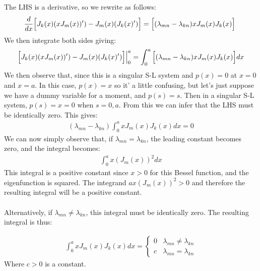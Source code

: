 \documentclass{article}
\begin{document}
The LHS is a derivative, so we rewrite as follows:
\begin{equation}
\begin{aligned}
\frac{d}{dx} \Big{[}J_k(x)(xJ_m(x))') - J_m(x)(J_k(x)') \Big{]} = \Big{[}(\lambda_{mn} - \lambda_{kn})xJ_m(x)J_k(x)\Big{]}\
\end{aligned}
\end{equation}
We then integrate both sides giving:
\begin{equation}
\begin{aligned}
 \Big{[}J_k(x)(xJ_m(x))') - J_m(x)(J_k(x)') \Big{]}\Big{|}_0^a = \int_0^a\Big{[}(\lambda_{mn} - \lambda_{kn})xJ_m(x)J_k(x)\Big{]}dx
\end{aligned}
\end{equation}
We then observe that, since this is a singular S-L system and $p(x) = 0$ at $x=0$ and $x=a$. In this case, $p(x) = x$ so it' a little confusing, but let's just suppose we have a dummy variable for a moment, and $p(s) = s$. Then in a singular S-L system, $p(s) = x = 0$ when $s = 0, a$. From this we can infer that the LHS must be identically zero. This gives:
\begin{equation}
 \begin{aligned}
(\lambda_{mn} - \lambda_{kn})\int_0^axJ_m(x)J_k(x)dx = 0
\end{aligned}
\end{equation}
We can now simply observe that, if $\lambda_{mn} = \lambda_{kn}$, the leading constant becomes zero, and the integral becomes:
\begin{equation}
\begin{aligned}
\int_0^ax(J_m(x))^2dx
\end{aligned}
\end{equation}
This integral is a positive constant since $x>0$ for this Bessel function, and the eigenfunction is squared. The integrand $ax(J_m(x))^2 >0$ and therefore the resulting integral will be a positive constant. \\
\\
Alternatively, if $\lambda_{mn} \neq \lambda_{kn}$, this integral must be identically zero. The resulting integral is thus:
\begin{tcolorbox}[minipage,colback=white,arc=0pt,outer arc=0pt]
\begin{equation}
\begin{aligned}
\int_0^axJ_m(x)J_k(x)dx =
 \begin{cases} 
      0 & \lambda_{mn} \neq \lambda_{kn} \\
      c & \lambda_{mn} = \lambda_{kn}
   \end{cases}
\end{aligned}
\end{equation}
Where $c>0$ is a constant.
\end{tcolorbox}
\end{document}
